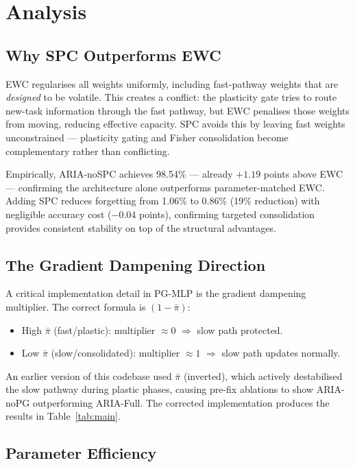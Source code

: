 \documentclass[10pt,twocolumn]{article}
\begin{document}
\section{Analysis}
\label{sec:analysis}

\subsection{Why SPC Outperforms EWC}

EWC regularises all weights uniformly, including fast-pathway weights that are
\emph{designed} to be volatile. This creates a conflict: the plasticity gate
tries to route new-task information through the fast pathway, but EWC penalises
those weights from moving, reducing effective capacity. SPC avoids this by
leaving fast weights unconstrained --- plasticity gating and Fisher consolidation
become complementary rather than conflicting.

Empirically, ARIA-noSPC achieves 98.54\% --- already $+1.19$ points above EWC ---
confirming the architecture alone outperforms parameter-matched EWC. Adding SPC
reduces forgetting from 1.06\% to 0.86\% (19\% reduction) with negligible accuracy
cost ($-0.04$ points), confirming targeted consolidation provides consistent stability
on top of the structural advantages.

\subsection{The Gradient Dampening Direction}

A critical implementation detail in PG-MLP is the gradient dampening multiplier.
The correct formula is $(1-\bar\pi)$:
\begin{itemize}
  \item High $\bar\pi$ (fast/plastic): multiplier $\approx 0$ $\Rightarrow$ slow path protected.
  \item Low $\bar\pi$ (slow/consolidated): multiplier $\approx 1$ $\Rightarrow$ slow path updates normally.
\end{itemize}
An earlier version of this codebase used $\bar\pi$ (inverted), which actively
destabilised the slow pathway during plastic phases, causing pre-fix ablations to
show ARIA-noPG outperforming ARIA-Full. The corrected implementation produces the
results in Table~\ref{tab:main}.

\subsection{Parameter Efficiency}
\end{document}
